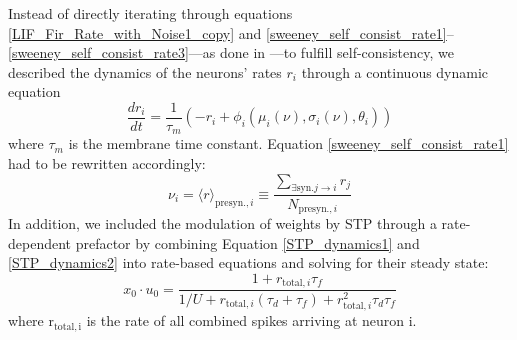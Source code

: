 \documentclass[10pt,a4paper]{article}
\begin{document}
Instead of directly iterating through equations \eqref{LIF_Fir_Rate_with_Noise1_copy} and \eqref{sweeney_self_consist_rate1}--\eqref{sweeney_self_consist_rate3}---as done in \cite{Sweeney_Paper}---to fulfill self-consistency, we described the dynamics of the neurons' rates $r_i$ through a continuous dynamic equation
\begin{equation}
\frac{dr_i}{dt} = \frac{1}{\tau_m} \left( -r_i + \phi_i(\mu_i(\nu),\sigma_i(\nu),\theta_i) \right)
\label{dyn_rate_equation}
\end{equation}
where $\tau_m$ is the membrane time constant. Equation \eqref{sweeney_self_consist_rate1} had to be rewritten accordingly:
\begin{equation}
\nu_i = {\langle r \rangle}_{\mathrm{ presyn.},i} \equiv \frac{\sum_{\mathrm{ \exists syn.} j\rightarrow i} r_j}{N_{\mathrm{ presyn.}, i}}
\label{sweeney_self_consist_rate1_mod}
\end{equation}
In addition, we included the modulation of weights by STP through a rate-dependent prefactor by combining Equation \eqref{STP_dynamics1} and \eqref{STP_dynamics2} into rate-based equations and solving for their steady state:
\begin{equation}
x_{0}\cdot u_{0} = \frac{1+r_{\mathrm{ total},i} \tau_f}{1/U + r_{\mathrm{ total},i} (\tau_d + \tau_f)+ r_{\mathrm{ total},i}^2 \tau_d \tau_f}
\label{STP_steady}
\end{equation}
where $\mathrm{r_{\mathrm{ total},i}}$ is the rate of all combined spikes arriving at neuron i.
\end{document}
